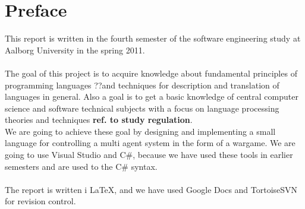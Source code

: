 \chapter*{Preface}
This report is written in the fourth semester of the software engineering study at Aalborg University in the spring 2011.
\\
\\
The goal of this project is to acquire knowledge about fundamental principles of programming languages ??and techniques for description and translation of languages in general. Also a goal is to get a basic knowledge of central computer science and software technical subjects with a focus on language processing theories and techniques \textbf{ref. to study regulation}.\\
  We are going to achieve these goal by designing and implementing a small language for controlling a multi agent system in the form of a wargame. We are going to use Visual Studio and C\#, because we have used these tools in earlier semesters and are used to the C\# syntax.
	\\
	\\
	The report is written i \LaTeX, and we have used Google Docs and TortoiseSVN for revision control.